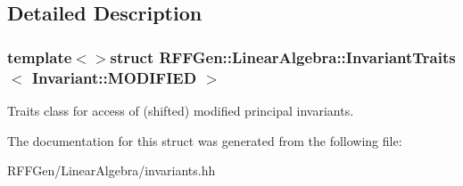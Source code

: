 \subsection{Detailed Description}
\subsubsection*{template$<$$>$struct R\-F\-F\-Gen\-::\-Linear\-Algebra\-::\-Invariant\-Traits$<$ Invariant\-::\-M\-O\-D\-I\-F\-I\-E\-D $>$}

Traits class for access of (shifted) modified principal invariants. 

The documentation for this struct was generated from the following file\-:\begin{DoxyCompactItemize}
\item 
R\-F\-F\-Gen/\-Linear\-Algebra/invariants.\-hh\end{DoxyCompactItemize}

